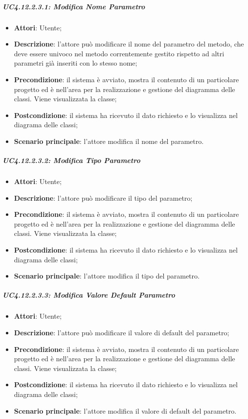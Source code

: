 \subparagraph{UC4.12.2.3.1: Modifica Nome Parametro}
\label{UC4.12.2.3.1}
\begin{itemize}
	\item \textbf{Attori}: Utente;
	\item \textbf{Descrizione}: l'attore può modificare il nome del parametro del metodo, che deve essere univoco nel metodo correntemente gestito rispetto ad altri parametri già inseriti con lo stesso nome;
	\item \textbf{Precondizione}: il sistema è avviato, mostra il contenuto di un particolare progetto ed è nell'area per la realizzazione e gestione del diagramma delle classi. Viene visualizzata la classe;
	\item \textbf{Postcondizione}: il sistema ha ricevuto il dato richiesto e lo visualizza nel diagrama delle classi;
	\item \textbf{Scenario principale}: l'attore modifica il nome del parametro.
\end{itemize}

\subparagraph{UC4.12.2.3.2: Modifica Tipo Parametro}
\label{UC4.12.2.3.2}
\begin{itemize}
	\item \textbf{Attori}: Utente;
	\item \textbf{Descrizione}: l'attore può modificare il tipo del parametro;
	\item \textbf{Precondizione}: il sistema è avviato, mostra il contenuto di un particolare progetto ed è nell'area per la realizzazione e gestione del diagramma delle classi. Viene visualizzata la classe;
	\item \textbf{Postcondizione}: il sistema ha ricevuto il dato richiesto e lo visualizza nel diagrama delle classi;
	\item \textbf{Scenario principale}: l'attore modifica il tipo del parametro.
\end{itemize}

\subparagraph{UC4.12.2.3.3: Modifica Valore Default Parametro}
\label{UC4.12.2.3.3}
\begin{itemize}
	\item \textbf{Attori}: Utente;
	\item \textbf{Descrizione}: l'attore può modificare il valore di default del parametro;
	\item \textbf{Precondizione}: il sistema è avviato, mostra il contenuto di un particolare progetto ed è nell'area per la realizzazione e gestione del diagramma delle classi. Viene visualizzata la classe;
	\item \textbf{Postcondizione}: il sistema ha ricevuto il dato richiesto e lo visualizza nel diagrama delle classi;
	\item \textbf{Scenario principale}: l'attore modifica il valore di default del parametro.
\end{itemize}

